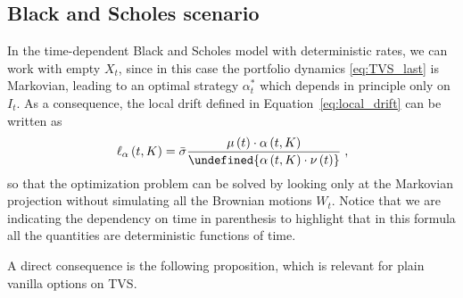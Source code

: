 \documentclass[runningheads]{m2ef}
\let\norm\undefined %
\DeclarePairedDelimiter\norm{\lVert}{\rVert}
\newcommand{\change}[1]{{\color{red} {#1}}}%
\begin{document}
\subsection{Black and Scholes \change{scenario}}\label{subsec:BS_model}
In the time-dependent Black and Scholes model with deterministic rates, we can work with empty $X_t$, since in this case the portfolio dynamics \eqref{eq:TVS_last} is Markovian, leading to an optimal strategy $\alpha_t^*$ which depends in principle only on $I_t$. As a consequence, the local drift defined in Equation~\eqref{eq:local_drift} can be written as
\begin{equation}
     \ell_\alpha \left(t,K\right) = \bar{\sigma}   \frac{\mu\left(t\right) \cdot \alpha\left(t,K\right)}{\norm{\alpha\left(t,K\right) \cdot \nu\left(t\right)}} \; ,  
\end{equation}
so that the optimization problem can be solved by looking only at the Markovian projection without simulating all the Brownian motions $W_t$. Notice that we are indicating the dependency on time in parenthesis to highlight that in this formula all the quantities are deterministic functions of time.

A direct consequence is the following proposition, which is relevant for plain vanilla options on TVS.
\end{document}
